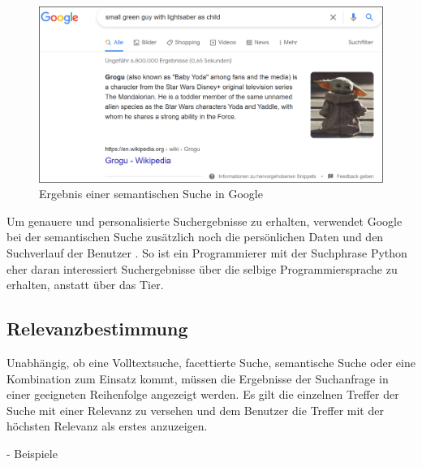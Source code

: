 \begin{figure}[H]
    \centering
    \includegraphics[width=1\linewidth]{images/baby_yoda.png}
    \caption{Ergebnis einer semantischen Suche in Google}
    \label{fig:baby_yoda_google}
\end{figure}

Um genauere und personalisierte Suchergebnisse zu erhalten, verwendet Google bei der semantischen Suche zusätzlich noch die persönlichen Daten und den Suchverlauf der Benutzer \cite{MichalPecanek.2020b}. So ist ein Programmierer mit der Suchphrase \glqq Python\grqq{} eher daran interessiert Suchergebnisse über die selbige Programmiersprache zu erhalten, anstatt über  das Tier.


\subsection{Relevanzbestimmung\label{subsec2.3.5:Unterunterpunkt-5}}

Unabhängig, ob eine Volltextsuche, facettierte Suche, semantische Suche oder eine Kombination zum Einsatz kommt, müssen die Ergebnisse der Suchanfrage in einer geeigneten Reihenfolge angezeigt werden. Es gilt die einzelnen Treffer der Suche mit einer Relevanz zu versehen und dem Benutzer die Treffer mit der höchsten Relevanz als erstes anzuzeigen.

- Beispiele


